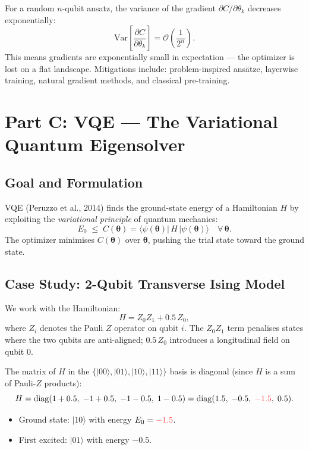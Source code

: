 \documentclass[a4paper,11pt]{article}
\newcommand{\crd}[1]{\textcolor{ibmred}{#1}}
\newcommand{\ket}[1]{|#1\rangle}
\newcommand{\bra}[1]{\langle#1|}
\begin{document}
\begin{warningbox}
For a random $n$-qubit ansatz, the variance of the gradient
$\partial C/\partial\theta_k$ decreases exponentially:
\[
    \mathrm{Var}\!\left[\frac{\partial C}{\partial\theta_k}\right]
    = \mathcal{O}\!\left(\frac{1}{2^n}\right).
\]
This means gradients are exponentially small in expectation — the optimizer
is lost on a flat landscape. Mitigations include: problem-inspired ansätze,
layerwise training, natural gradient methods, and classical pre-training.
\end{warningbox}

\section{Part C: VQE — The Variational Quantum Eigensolver}

\subsection{Goal and Formulation}

VQE (Peruzzo et al., 2014) finds the ground-state energy of a Hamiltonian $H$
by exploiting the \emph{variational principle} of quantum mechanics:
\begin{equation}
    E_0 \;\leq\; C(\boldsymbol\theta)
    = \bra{\psi(\boldsymbol\theta)}\,H\,\ket{\psi(\boldsymbol\theta)}
    \quad \forall\,\boldsymbol\theta.
\end{equation}
The optimizer minimises $C(\boldsymbol\theta)$ over $\boldsymbol\theta$,
pushing the trial state toward the ground state.

\subsection{Case Study: 2-Qubit Transverse Ising Model}

We work with the Hamiltonian:
\begin{equation}
    \label{eq:ising}
    H = Z_0 Z_1 + 0.5\, Z_0,
\end{equation}
where $Z_i$ denotes the Pauli $Z$ operator on qubit $i$.
The $Z_0 Z_1$ term penalises states where the two qubits are anti-aligned;
$0.5\, Z_0$ introduces a longitudinal field on qubit 0.

\begin{mathbox}
The matrix of $H$ in the $\{\ket{00}, \ket{01}, \ket{10}, \ket{11}\}$ basis is diagonal
(since $H$ is a sum of Pauli-$Z$ products):
\[
H = \mathrm{diag}(1 + 0.5,\;-1 + 0.5,\;-1 - 0.5,\;1 - 0.5)
  = \mathrm{diag}(1.5,\;-0.5,\;\crd{-1.5},\;0.5).
\]
\begin{itemize}
    \item Ground state: $\ket{10}$ with energy $E_0 = \crd{-1.5}$.
    \item First excited: $\ket{01}$ with energy $-0.5$.
\end{itemize}
\end{mathbox}
\end{document}
